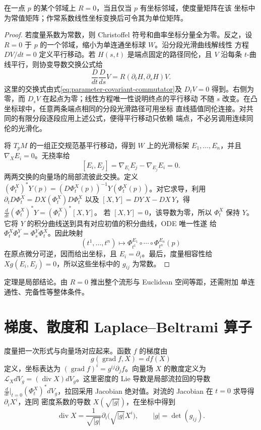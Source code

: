\begin{theorem}[局部平坦性]\label{thm:riemannian-local-flatness}
在一点 $p$ 的某个邻域上 $R=0$，当且仅当 $p$ 有坐标邻域，使度量矩阵在该
坐标中为常值矩阵；作常系数线性坐标变换后可令其为单位矩阵。
\end{theorem}
\begin{proof}
若度量系数为常数，则 Christoffel 符号和曲率坐标分量全为零。反之，设
$R=0$ 于 $p$ 的一个邻域，缩小为单连通坐标球 $W$。沿分段光滑曲线解线性
方程 $DV/dt=0$ 定义平行移动。若 $H(s,t)$ 是端点固定的路径同伦，且 $V$
沿每条 $t$-曲线平行，则协变导数交换公式给
\[
 \frac D{dt}\frac D{ds}V
 =R(\partial_tH,\partial_sH)V.
\]
这里的交换式由式\eqref{eq:parameter-covariant-commutator}及 $D_tV=0$
得到。右侧为零，而 $D_sV$ 在起点为零；线性方程唯一性说明终点的平行移动
不随 $s$ 改变。在凸坐标球中，任意两条端点相同的分段光滑路径可用坐标
直线插值同伦连接。对共同的有限分段逐段应用上述公式，便得平行移动只依赖
端点，不必另调用连续同伦的光滑化。

将 $T_pM$ 的一组正交规范基平行移动，得到 $W$ 上的光滑标架
$E_1,\ldots,E_n$，并且 $\nabla_XE_i=0$。无挠率给
\[
 [E_i,E_j]=\nabla_{E_i}E_j-\nabla_{E_j}E_i=0.
\]
两两交换的向量场的局部流彼此交换。定义
$(\Phi_t^X)^*Y(p)=(D\Phi_t^X(p))^{-1}Y(\Phi_t^X(p))$。对它求导，利用
$\partial_tD\Phi_t^X=DX(\Phi_t^X)D\Phi_t^X$ 以及
$[X,Y]=DY\,X-DX\,Y$，得
$\frac d{dt}(\Phi_t^X)^*Y=(\Phi_t^X)^*[X,Y]$。
若 $[X,Y]=0$，该导数为零，所以 $\Phi_t^X$
保持 $Y$。它将 $Y$ 的积分曲线送到具有对应初值的积分曲线，ODE 唯一性遂
给 $\Phi_t^X\Phi_s^Y=\Phi_s^Y\Phi_t^X$。因此映射
\[
 (t^1,\ldots,t^n)\longmapsto
 \Phi^{E_1}_{t^1}\circ\cdots\circ\Phi^{E_n}_{t^n}(p)
\]
在原点微分可逆，因而给出坐标，且 $E_i=\partial_i$。最后，度量相容性给
$Xg(E_i,E_j)=0$，所以这些坐标中的 $g_{ij}$ 为常数。
\end{proof}

定理是局部结论。由 $R=0$ 推出整个流形与 Euclidean 空间等距，还需附加
单连通性、完备性等整体条件。

\section{梯度、散度和 Laplace--Beltrami 算子}

度量把一次形式与向量场对应起来。函数 $f$ 的梯度由
\[
 g(\operatorname{grad}f,X)=df(X)
\]
定义，坐标表达为 $(\operatorname{grad}f)^i=g^{ij}\partial_jf$。向量场
$X$ 的散度定义为 $\mathcal L_XdV_g=(\operatorname{div}X)dV_g$。这里密度的
Lie 导数是局部流拉回的导数 $\frac d{dt}|_{t=0}(\Phi_t^X)^*dV_g$，拉回采用
Jacobian 绝对值。对流的 Jacobian 在 $t=0$ 求导得 $\partial_iX^i$，连同
密度系数的导数 $X(\sqrt{|g|})$，在坐标中得到
\begin{equation}\label{eq:riemannian-divergence-coordinate}
 \operatorname{div}X
 =\frac1{\sqrt{|g|}}\partial_i\bigl(\sqrt{|g|}X^i\bigr),
 \qquad |g|=\det(g_{ij}).
\end{equation}

